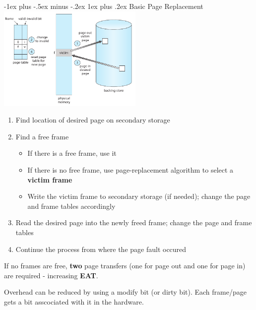 \documentclass[8pt,landscape]{article}
\makeatletter
\renewcommand{\subsubsection}{\@startsection{subsubsection}{3}{0mm}%
                                {-1ex plus -.5ex minus -.2ex}%
                                {1ex plus .2ex}%
                                {\normalfont\tiny\bfseries}}
\makeatother
\begin{document}
\begin{multicols}{3}
\begin{tiny}
		\subsubsection{Basic Page Replacement}
		\begingroup
			\centering
			\includegraphics[width=7cm]{pageReplace.png}
		\endgroup
		\begin{enumerate}[noitemsep]
			\item Find location of desired page on secondary storage
			\item Find a free frame
				\begin{itemize}[noitemsep]
					\item If there is a free frame, use it
					\item If there is no free frame, use page-replacement algorithm to select
						a \textbf{victim frame}
					\item Write the victim frame to secondary storage (if needed); change the page
						and frame tables accordingly
				\end{itemize}
			\item Read the desired page into the newly freed frame; change the page and frame
				tables
			\item Continue the process from where the page fault occured
		\end{enumerate}
		If no frames are free, \textbf{two} page transfers (one for page out and one for page in) 
		are required - increasing \textbf{EAT}.

		Overhead can be reduced by using a modify bit (or dirty bit). Each frame/page gets a bit
		asscociated with it in the hardware.


\end{tiny}
\end{multicols}
\end{document}
